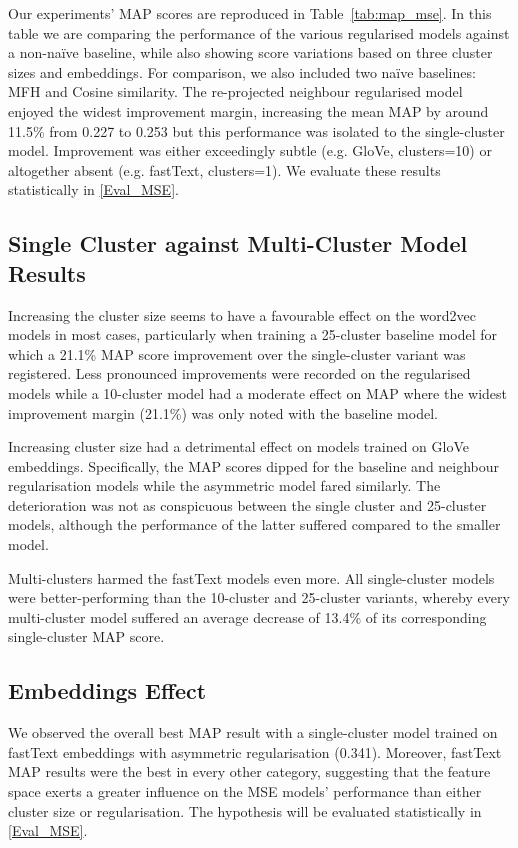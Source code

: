 Our experiments' \ac{MAP} scores are reproduced in Table~\ref{tab:map_mse}.  In this table we are comparing the performance of the various regularised models against a non-na\"ive baseline, while also showing score variations based on three cluster sizes and embeddings.  For comparison, we also included two na\"ive baselines: MFH and Cosine similarity.  %
The re-projected neighbour regularised model enjoyed the widest improvement margin, increasing the mean \ac{MAP} by around 11.5\% from 0.227 to 0.253 but this performance was isolated to the single-cluster model.  Improvement was either exceedingly subtle (e.g. GloVe, clusters=10) or altogether absent (e.g. fastText, clusters=1).  We evaluate these results statistically in \cref{Eval_MSE}.

\subsection{Single Cluster against Multi-Cluster Model Results}
Increasing the cluster size seems to have a favourable effect on the word2vec models in most cases, particularly when training a 25-cluster baseline model for which a 21.1\% \ac{MAP} score improvement over the single-cluster variant was registered.  Less pronounced improvements were recorded on the regularised models while a 10-cluster model had a moderate effect on \ac{MAP} where the widest improvement margin (21.1\%) was only noted with the baseline model.  

Increasing cluster size had a detrimental effect on models trained on GloVe embeddings.  Specifically, the \ac{MAP} scores dipped for the baseline and neighbour regularisation models while the asymmetric model fared similarly.  The deterioration was not as conspicuous between the single cluster and 25-cluster models, although the performance of the latter suffered compared to the smaller model.  

Multi-clusters harmed the fastText models even more.  All single-cluster models were better-performing than the 10-cluster and 25-cluster variants, whereby every multi-cluster model suffered an average decrease of 13.4\% of its corresponding single-cluster \ac{MAP} score.  

\subsection{Embeddings Effect} \label{ustalov_embeddings}
We observed the overall best \ac{MAP} result with a single-cluster model trained on fastText embeddings with asymmetric regularisation (0.341).  Moreover, fastText \ac{MAP} results were the best in every other category, suggesting that the feature space exerts a greater influence on the \ac{MSE} models' performance than either cluster size or regularisation.  The hypothesis will be evaluated statistically in \cref{Eval_MSE}.

